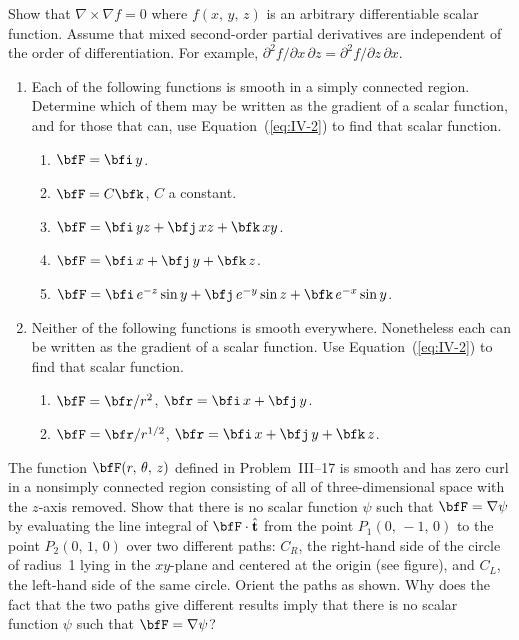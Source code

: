 \begin{problems}
\prob
Show that $\nabla\times\nabla f = 0$ where $f(x,\,y,\,z)$ is an
arbitrary differentiable scalar function.  Assume that mixed
second-order partial derivatives are independent of the order of
differentiation.  For example,
$\partial^2 f/\partial x\,\partial z = \partial^2 f/\partial z\,\partial x$.

\prob
\begin{enumerate}[label=(\alph*)]
\item Each of the following functions is smooth in a simply connected
  region.  Determine which of them may be written as the gradient of a
  scalar function, and for those that can, use Equation~(\ref{eq:IV-2})
  to find that scalar function.
  \begin{enumerate}[label=(\roman*)]
  \item $\bfF = \bfi\,y$.
  \item $\bfF = C\bfk$, \quad $C$ a constant.
  \item $\bfF = \bfi\,yz + \bfj\,xz + \bfk\,xy$.
  \item $\bfF = \bfi\,x + \bfj\,y + \bfk\,z$.
  \item $\bfF = \bfi\,e^{-z}\sin y + \bfj\,e^{-y}\sin z
    + \bfk\,e^{-x}\sin y$.
  \end{enumerate}
\item Neither of the following functions is smooth everywhere.
  Nonetheless each can be written as the gradient of a scalar function.
  Use Equation~(\ref{eq:IV-2}) to find that scalar function.
  \begin{enumerate}[label=(\roman*)]
  \item $\bfF = \bfr/r^2$, \quad $\bfr = \bfi\,x + \bfj\,y$.
  \item $\bfF = \bfr/r^{1/2}$, \quad
    $\bfr = \bfi\,x + \bfj\,y + \bfk\,z$.
  \end{enumerate}
\end{enumerate}

\prob
The function $\bfF(r,\,\theta,\,z)$ defined in Problem~III--17 is
smooth and has zero curl in a nonsimply connected region consisting
of all of three-dimensional space with the $z$-axis removed.  Show
that there is no scalar function $\psi$ such that
$\bfF = \nabla\psi$ by evaluating the line integral of
$\bfF\cdot\hat{\mathbf{t}}$ from the point $P_1(0,\,-1,\,0)$ to the
point $P_2(0,\,1,\,0)$ over two different paths: $C_R$, the
right-hand side of the circle of radius~1 lying in the $xy$-plane and
centered at the origin (see figure), and $C_L$, the left-hand side of
the same circle.  Orient the paths as shown.  Why does the fact that
the two paths give different results imply that there is no scalar
function $\psi$ such that $\bfF = \nabla\psi$?


\end{problems}
